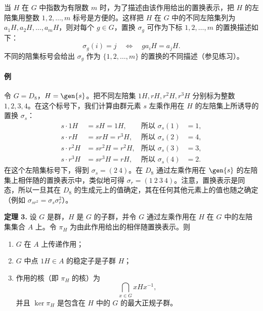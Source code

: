 当 $H$ 在 $G$ 中指数为有限数 $m$ 时，为了描述由该作用给出的置换表示，把 $H$ 的左陪集用整数 $1,2,\ldots,m$ 标号是方便的。这样把 $H$ 在 $G$ 中的不同左陪集列为 $a_1H,a_2H,\ldots,a_mH$，则对每个 $g\in G$，置换 $\sigma_g$ 可作为下标 $1,2,\ldots,m$ 的置换描述如下：
\[
  \sigma_g(i)=j\quad\Longleftrightarrow\quad ga_iH=a_jH.
\]
不同的陪集标号会给出 $\sigma_g$ 作为 $\{1,2,\ldots,m\}$ 的置换的不同描述（参见练习）。

\paragraph{例}
令 $G=D_8$，$H=\gen{s}$。把不同左陪集 $1H,rH,r^2H,r^3H$ 分别标为整数 $1,2,3,4$。在这个标号下，我们计算由群元素 $s$ 左乘作用在 $H$ 的左陪集上所诱导的置换 $\sigma_s$：
\begin{align*}
  s\cdot1H&=sH=1H,       &\text{所以 }\sigma_s(1)&=1,\\
  s\cdot rH&=srH=r^3H,  &\text{所以 }\sigma_s(2)&=4,\\
  s\cdot r^2H&=sr^2H=r^2H, &\text{所以 }\sigma_s(3)&=3,\\
  s\cdot r^3H&=sr^3H=rH, &\text{所以 }\sigma_s(4)&=2.
\end{align*}
在这个左陪集标号下，得到 $\sigma_s=(2\ 4)$。在 $D_8$ 通过左乘作用在 $\gen{s}$ 的左陪集上相伴随的置换表示中，类似地可得 $\sigma_r=(1\ 2\ 3\ 4)$。注意，置换表示是同态，所以一旦其在 $D_8$ 的生成元上的值确定，其在任何其他元素上的值也随之确定（例如 $\sigma_{sr^2}=\sigma_s\sigma_r^2$）。

\medskip
\noindent\textbf{定理 3.} 设 $G$ 是群，$H$ 是 $G$ 的子群，并令 $G$ 通过左乘作用在 $H$ 在 $G$ 中的左陪集集合 $A$ 上。令 $\pi_H$ 为由此作用给出的相伴随置换表示。则
\begin{enumerate}[label=(\arabic*)]
  \item $G$ 在 $A$ 上传递作用；
  \item $G$ 中点 $1H\in A$ 的稳定子是子群 $H$；
  \item 作用的核（即 $\pi_H$ 的核）为
  \[
    \bigcap_{x\in G}xHx^{-1},
  \]
  并且 $\ker\pi_H$ 是包含在 $H$ 中的 $G$ 的最大正规子群。
\end{enumerate}

